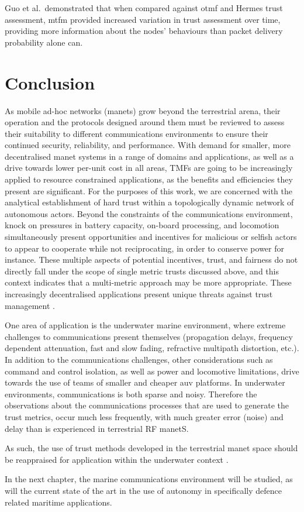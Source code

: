 Guo et al.\ demonstrated that when compared against \gls{otmf} and Hermes trust assessment, \gls{mtfm} provided increased variation in trust assessment over time, providing more information about the nodes' behaviours than packet delivery probability alone can.
\section{Conclusion}
As mobile ad-hoc networks (\gls{manet}s) grow beyond the terrestrial arena, their operation and the protocols designed around them must be reviewed to assess their suitability to different communications environments to ensure their continued security, reliability, and performance.
With demand for smaller, more decentralised \gls{manet} systems in a range of domains and applications, as well as a drive towards lower per-unit cost in all areas, TMFs are going to be increasingly applied to resource constrained applications, as the benefits and efficiencies they present are significant.
For the purposes of this work, we are concerned with the analytical establishment of hard trust within a topologically dynamic network of autonomous actors.
Beyond the constraints of the communications environment, knock on pressures in battery capacity, on-board processing, and locomotion simultaneously present opportunities and incentives for malicious or selfish actors to appear to cooperate while not reciprocating, in order to conserve power for instance.
These multiple aspects of potential incentives, trust, and fairness do not directly fall under the scope of single metric trusts discussed above, and this context indicates that a multi-metric approach may be more appropriate.
These increasingly decentralised applications present unique threats against trust management \cite{Caiti2011}.

One area of application is the underwater marine environment, where extreme challenges to communications present themselves (propagation delays, frequency dependent attenuation, fast and slow fading, refractive multipath distortion, etc.).
In addition to the communications challenges, other considerations such as command and control isolation, as well as power and locomotive limitations, drive towards the use of teams of smaller and cheaper \gls{auv} platforms.
In underwater environments, communications is both sparse and noisy.
Therefore the observations about the communications processes that are used to generate the trust metrics, occur much less frequently, with much greater error (noise) and delay than is experienced in terrestrial RF \gls{manet}S.

As such, the use of trust methods developed in the terrestrial \gls{manet} space should be reappraised for application within the underwater context \cite{Pavan2015}.

In the next chapter, the marine communications environment will be studied, as will the current state of the art in the use of autonomy in specifically defence related maritime applications.
\ifx\ifthesis\undefined

\else
\fi
